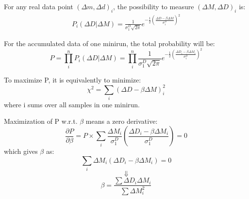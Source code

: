 For any real data point $(\Delta m, \Delta d)_i$, the possibility to measure
$(\Delta M, \Delta D)_i$ is:
\begin{equation}
    \begin{gathered}
	P_i(\Delta D|\Delta M) = \frac{1}{\sigma_1^D\sqrt{2\pi}} 
	    e^{-\frac{1}{2}\left( \frac{\Delta D - \beta\Delta M}{\sigma_1^D}\right)^2}
    \end{gathered}
\end{equation}

For the accumulated data of one minirun, the total probability will be:
\begin{equation}
    P = \prod_i^n P_i(\Delta D|\Delta M) = \prod_i^n \frac{1}{\sigma_1^D\sqrt{2\pi}} 
	    e^{-\frac{1}{2}\left( \frac{\Delta D_i - \beta\Delta M_i}{\sigma_1^D}\right)^2}
\end{equation}

To maximize P, it is equivalently to minimize:
\begin{equation}
    \chi^2 = \sum_i (\Delta D - \beta\Delta M)_i^2
    \label{eq:regression_chi2}
\end{equation}
where i sums over all samples in one minirun.

Maximization of P w.r.t. $\beta$ means a zero derivative:
\begin{equation}
    \frac{\partial P}{\partial \beta} = P \times 
    \sum_i \frac{\Delta M_i}{\sigma_1^D} \left( \frac{\Delta D_i - \beta\Delta M_i}{\sigma_1^D}\right)
    = 0
\end{equation}
which gives $\beta$ as:
\begin{equation}
    \sum_i \Delta M_i (\Delta D_i - \beta\Delta M_i) = 0 
\end{equation}
$$ \Downarrow $$
\begin{equation}
    \beta = \frac{\sum \Delta D_i \Delta M_i}{\sum \Delta M^2_i}
\end{equation}

